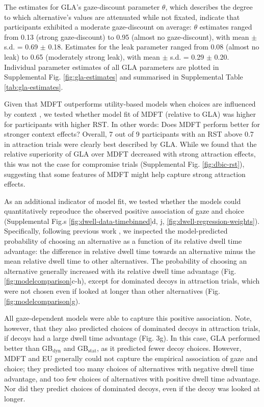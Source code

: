 \documentclass[11pt, a4paper]{article}
\begin{document}
The estimates for GLA’s gaze-discount parameter $\theta$, which describes the degree to which alternative’s values are attenuated while not fixated, indicate that participants exhibited a moderate gaze-discount on average: $\theta$ estimates ranged from 0.13 (strong gaze-discount) to 0.95 (almost no gaze-discount), with mean $\pm$ s.d. = 0.69 $\pm$ 0.18. Estimates for the leak parameter ranged from 0.08 (almost no leak) to 0.65 (moderately strong leak), with mean $\pm$ s.d. = 0.29 $\pm$ 0.20. Individual parameter estimates of all GLA parameters are plotted in Supplemental Fig. \ref{fig:gla-estimates} and summarised in Supplemental Table \ref{tab:gla-estimates}.

Given that MDFT outperforms utility-based models when choices are influenced by context \parencite{berkowitsch2014RigorouslyTestingMultialternative}, we tested whether model fit of MDFT (relative to GLA) was higher for participants with higher RST. In other words: Does MDFT perform better for stronger context effects? Overall, 7 out of 9 participants with an RST above 0.7 in attraction trials were clearly best described by GLA. While we found that the relative superiority of GLA over MDFT decreased with strong attraction effects, this was not the case for compromise trials (Supplemental Fig. \ref{fig:dbic-rst}), suggesting that some features of MDFT might help capture strong attraction effects.

As an additional indicator of model fit, we tested whether the models could quantitatively reproduce the observed positive association of gaze and choice (Supplemental Fig.s \ref{fig:dwell-data-timebinned}d, j, \ref{fig:dwell-regression-weights}). Specifically, following previous work \parencite{krajbich2010VisualFixationsComputation,krajbich2011MultialternativeDriftdiffusionModel}, we inspected the model-predicted probability of choosing an alternative as a function of its relative dwell time advantage: the difference in relative dwell time towards an alternative minus the mean relative dwell time to other alternatives. The probability of choosing an alternative generally increased with its relative dwell time advantage (Fig. \ref{fig:modelcomparison}c-h), except for dominated decoys in attraction trials, which were not chosen even if looked at longer than other alternatives (Fig. \ref{fig:modelcomparison}g).

All gaze-dependent models were able to capture this positive association. Note, however, that they also predicted choices of dominated decoys in attraction trials, if decoys had a large dwell time advantage (Fig. 3g). In this case, GLA performed better than GB$_{\text{dyn}}$ and GB$_{\text{stat}}$, as it predicted fewer decoy choices. However, MDFT and EU generally could not capture the empirical association of gaze and choice; they predicted too many choices of alternatives with negative dwell time advantage, and too few choices of alternatives with positive dwell time advantage. 
Nor did they predict choices of dominated decoys, even if the decoy was looked at longer.
\end{document}
